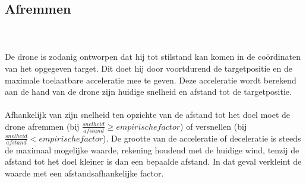 \subsection{Afremmen}
\\
\\
De drone is zodanig ontworpen dat hij tot stilstand kan komen in de co\"ordinaten van het opgegeven target. Dit doet hij door voortdurend de targetpositie en de maximale toelaatbare acceleratie mee te geven. Deze acceleratie wordt berekend aan de hand van de drone zijn huidige snelheid en afstand tot de targetpositie.
\\
\\
Afhankelijk van zijn snelheid ten opzichte van de afstand tot het doel moet de drone afremmen (bij $\frac{snelheid}{afstand}  \geq empirische factor$) of versnellen (bij $\frac{snelheid}{afstand}  < empirische factor$). De grootte van de acceleratie of deceleratie is steeds de maximaal mogelijke waarde, rekening houdend met de huidige wind, tenzij de afstand tot het doel kleiner is dan een bepaalde afstand. In dat geval verkleint de waarde met een afstandsafhankelijke factor.